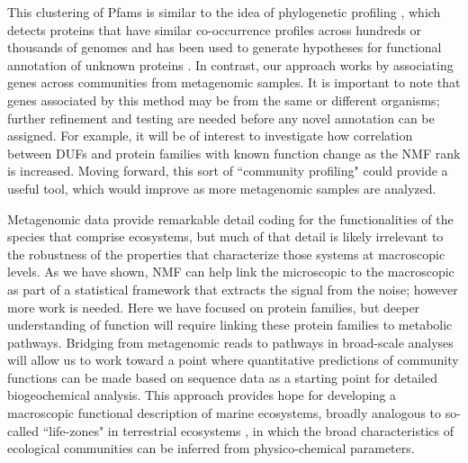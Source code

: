 This clustering of Pfams is similar to the idea of phylogenetic profiling \cite{pellegrini_assigning_1999}, which detects proteins that have similar co-occurrence profiles across hundreds or thousands of genomes and has been used to generate hypotheses for functional annotation of unknown proteins \cite{wu_life_2005}. In contrast, our approach works by associating genes across communities from metagenomic samples. It is important to note that genes associated by this method may be from the same or different organisms; further refinement and testing are needed before any novel annotation can be assigned.  For example, it will be of interest to investigate how correlation between DUFs and protein families with known function change as the NMF rank is increased.  Moving forward, this sort of ``community profiling" could provide a useful tool, which would improve as more metagenomic samples are analyzed.


Metagenomic data provide remarkable detail coding for the functionalities of the species that comprise ecosystems, but much of that detail is likely irrelevant to the robustness of the properties that characterize those systems at macroscopic levels.   As we have shown, NMF can help link the microscopic to the macroscopic as part of a statistical framework that extracts the signal from the noise; however more work is needed.  Here we have focused on protein families, but deeper understanding of function will require linking these protein families to metabolic pathways.  Bridging from metagenomic reads to pathways in broad-scale analyses will allow us to work toward a point where quantitative predictions of community functions can be made based on sequence data as a starting point for detailed biogeochemical analysis. This approach provides hope for developing a macroscopic functional description of marine ecosystems, broadly analogous to so-called ``life-zones" in terrestrial ecosystems \cite{holdridge_determination_1947, whittaker_classification_1962}, in which the broad characteristics of ecological communities can be inferred from physico-chemical parameters.

